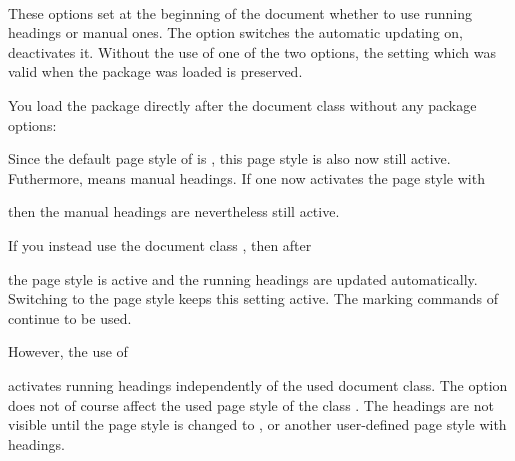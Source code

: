 \begin{Declaration}
\\
\end{Declaration}%
%
%
%
%
These options set at the beginning of the document whether to use running
headings or manual ones.  The option  switches the automatic
updating on,  deactivates it.  Without the use of one of
the two options, the setting which was valid when the package was loaded is
preserved.
%
\begin{Example}
  You load the package  directly after the document class
   without any package options:
  Since the default page style of  is ,
  this page style is also now still active.  Futhermore, 
  means manual headings.  If one now activates the page style
   with
\begin{lstcode}
  \pagestyle{scrheadings}
\end{lstcode}
  then the manual headings are nevertheless still active.

  If you instead use the document class , then after
  the page style  is active and the running headings are
  updated automatically.  Switching to the page style
   keeps this setting active.  The marking commands
  of  continue to be used.

  However, the use of
\begin{lstcode}
  \usepackage[automark]{scrpage2}
\end{lstcode}
  activates running headings independently of the used document class.
  The option does not of course affect the used page style 
  of the class . The headings are not visible until the
  page style is changed to
  , 
  or another user-defined page style with headings.%
\end{Example}%
%

